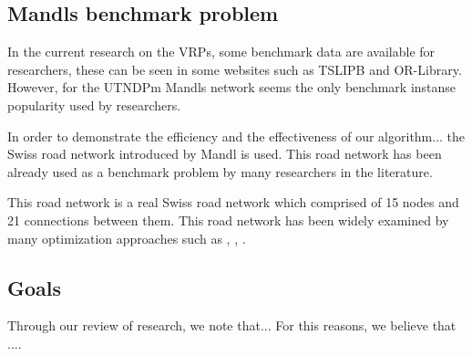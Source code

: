 

\subsection{Mandls benchmark problem}

In the current research on the VRPs, some benchmark data are available for researchers, these can be seen in some websites such as TSLIPB and OR-Library. However, for the UTNDPm Mandls network seems the only benchmark instanse popularity used by researchers. 

In order to demonstrate the efficiency and the effectiveness of our algorithm... the Swiss road network introduced by Mandl is used. This road network has been already used as a benchmark problem by many researchers in the literature. \citep{kechagiopoulos14}

This road network is a real Swiss road network which comprised of 15 nodes and 21 connections between them. This road network has been widely examined by many optimization approaches such as \citep{kechagiopoulos14}, \citep{fan09}, \citep{nikolic14}.


\subsection{Goals}
Through our review of research, we note that...
For this reasons, we believe that .... 